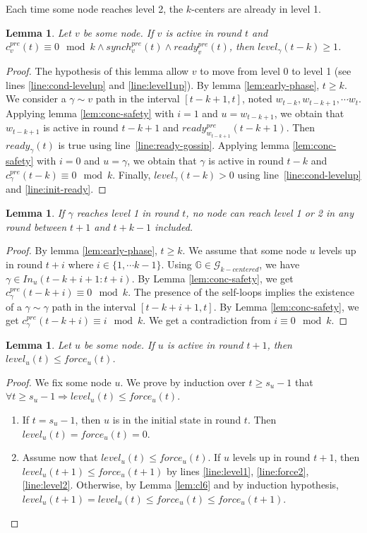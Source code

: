 \documentclass[11pt,letterpaper]{article}
\newtheorem{lem}[thm]{Lemma}
\newcommand{\cent}{\gamma}
\begin{document}
Each time some node reaches level 2, the $k$-centers are already in level 1.
\begin{lem} \label{lem:conc-safety-bis}
	Let $v$ be some node.
	If $v$ is active in round $t$ and $c^{pre}_v(t) \equiv 0 \mod k \wedge synch^{pre}_v(t) \wedge ready^{pre}_v(t)$, then
	$level_\cent(t-k) \geq 1$.
\end{lem}
\begin{proof}
	The hypothesis of this lemma allow $v$ to move from level 0 to level 1 (see lines \ref{line:cond-levelup} and \ref{line:level1up}). By lemma \ref{lem:early-phase}, $t \geq k$.
	We consider a $\cent \sim v$ path in the interval $[t-k+1,t]$, noted $w_{t-k}, w_{t-k+1}, \cdots w_t$.
	Applying lemma \ref{lem:conc-safety} with $i = 1$ and $u = w_{t-k+1}$, we obtain that $w_{t-k+1}$ is active in round $t-k+1$ and $ready^{pre}_{w_{t-k+1}}(t-k+1)$.
	Then $ready_\cent(t)$ is true using line~\ref{line:ready-gossip}.
	Applying lemma \ref{lem:conc-safety} with $i = 0$ and $u = \cent$, we obtain that $\cent$ is active in round $t-k$ and $c^{pre}_\cent(t-k) \equiv 0 \mod k$.
	Finally, $level_\cent(t-k) > 0$ using line~\ref{line:cond-levelup} and \ref{line:init-ready}.
\end{proof}

\begin{lem} \label{lem:no-close-level2}
	If $\cent$ reaches level 1 in round $t$, no node can reach level 1 or 2 in any round between $t+1$ and $t+k-1$ included.
\end{lem}
\begin{proof}
	By lemma \ref{lem:early-phase}, $t \geq k$.
	We assume that some node $u$ levels up in round $t+i$ where $i \in \{1, \cdots k-1\}$.
	Using $\mathds{G} \in \mathcal{G}_{k-centered}$, we have $\cent \in In_u(t-k+i+1:t+i)$.
	By Lemma \ref{lem:conc-safety}, we get $c_\cent^{pre}(t-k+i) \equiv 0 \mod k$.
	The presence of the self-loops implies the existence of a $\cent \sim \cent$ path in the interval $[t-k+i+1,t]$.
	By Lemma \ref{lem:conc-safety}, we get $c_\cent^{pre}(t-k+i) \equiv i \mod k$.
	We get a contradiction from $i \equiv 0 \mod k$.
\end{proof}

\begin{lem} \label{lem:greater-force}
	Let $u$ be some node. If $u$ is active in round $t+1$, then $level_u(t) \leq force_u(t)$.
\end{lem}
\begin{proof}
	\noindent We fix some node $u$. We prove by induction over $t \geq s_u-1$ that $\forall t \geq s_u-1 \Rightarrow level_u(t) \leq force_u(t)$.
	\begin{enumerate}
		\item If $t = s_u-1$, then $u$ is in the initial state in round $t$. Then $level_u(t) = force_u(t) = 0$.
		\item Assume now that $level_u(t) \leq force_u(t)$.
			If $u$ levels up in round $t+1$, then $level_u(t+1) \leq force_u(t+1)$ by lines \ref{line:level1}, \ref{line:force2}, \ref{line:level2}.
			Otherwise, by Lemma \ref{lem:cl6} and by induction hypothesis, $level_u(t+1) = level_u(t) \leq force_u(t) \leq force_u(t+1)$.
	\end{enumerate}
\end{proof}
\end{document}
